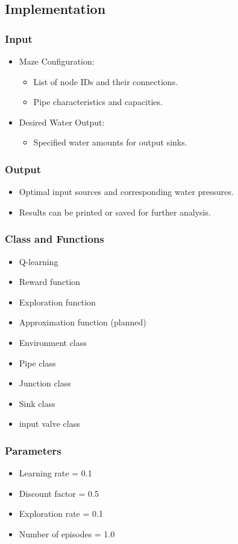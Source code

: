 \documentclass[notheorems, aspectratio=54]{beamer}
\begin{document}
\subsection{Implementation}
\begin{frame}
	\frametitle{Input}
	\begin{itemize}
		\item Maze Configuration:
		\begin{itemize}
			\item List of node IDs and their connections.
			\item Pipe characteristics and capacities.
		\end{itemize}
		\item Desired Water Output:
		\begin{itemize}
			\item Specified water amounts for output sinks.
		\end{itemize}
	\end{itemize}
\end{frame}


\begin{frame}
	\frametitle{Output}
	\begin{itemize}
		\item Optimal input sources and corresponding water pressures.
		\item Results can be printed or saved for further analysis.
	\end{itemize}
\end{frame}

\begin{frame}
	\frametitle{Class and Functions}
	\begin{itemize}
		\item Q-learning
		\item Reward function
		\item Exploration function
		\item Approximation function (planned)
		\item Environment class
		\item Pipe class
		\item Junction class
		\item Sink class
		\item input valve class
	\end{itemize}
\end{frame}

\begin{frame}
	\frametitle{Parameters}
	\begin{itemize}
		\item Learning rate = 0.1
		\item Discount factor = 0.5
		\item Exploration rate = 0.1
		\item Number of episodes = 1.0
	\end{itemize}
\end{frame}
\end{document}
